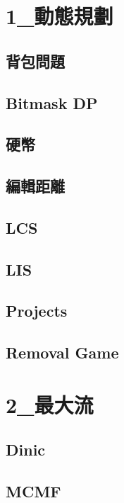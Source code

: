 \section{1_動態規劃}
\subsection{背包問題} 

\subsection{Bitmask DP} 

\subsection{硬幣} 

\subsection{編輯距離} 

\subsection{LCS} 

\subsection{LIS} 

\subsection{Projects} 

\subsection{Removal Game} 


\section{2_最大流}
\subsection{Dinic} 

\subsection{MCMF} 


% 
% 

